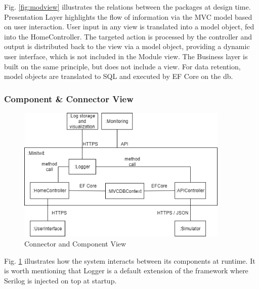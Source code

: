 \documentclass{article}
\begin{document}
Fig. \ref{fig:modview} illustrates the relations between the packages at design time.
Presentation Layer highlights the flow of information via the MVC model based on user interaction. User input in any view is translated into a model object, fed into the HomeController. The targeted action is processed by the controller and output is distributed back to the view via a model object, providing a dynamic user interface, which is not included in the Module view.
The Business layer is built on the same principle, but does not include a view. %
For data retention, model objects are translated to SQL and executed by EF Core on the db. 

\subsubsection*{Component \& Connector View}
\begin{figure}[H]
\centering
\includegraphics[width=0.9\textwidth]{images/ccview.png}
\caption{\label{fig:ccview}Connector and Component View}
\end{figure}
Fig. \ref{fig:ccview} illustrates how the system interacts between its components at runtime. It is worth mentioning that Logger is a default extension of the framework where Serilog is injected on top at startup.
\end{document}
